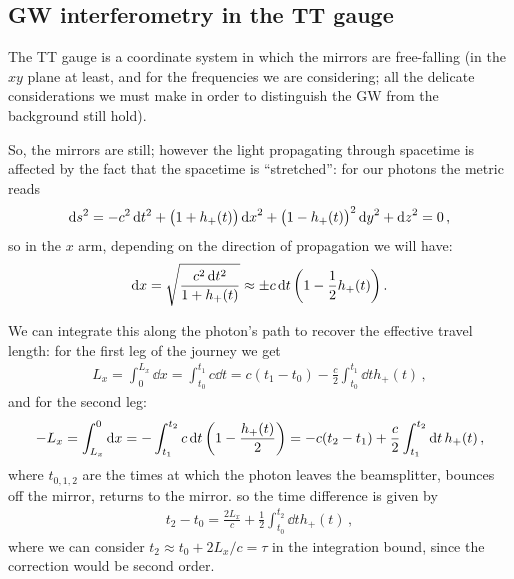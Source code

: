 \documentclass[main.tex]{subfiles}
\begin{document}
\subsection{GW interferometry in the TT gauge}



The TT gauge is a coordinate system in which the mirrors are free-falling (in the \(xy\) plane at least, and for the frequencies we are considering; all the delicate considerations we must make in order to distinguish the GW from the background still hold). 

So, the mirrors are still; however the light propagating through spacetime is affected by the fact that the spacetime is ``stretched'': for our photons the metric reads
%
\begin{align}
\dd{s^2} = - c^2 \dd{t^2} + \qty(1 + h_{+} (t)) \dd{x}^2 + \qty(1 - h_{+}(t))^2 \dd{y}^2 + \dd{z}^2 = 0
\,,
\end{align}
%
so in the \(x\) arm, depending on the direction of propagation we will have: 
%
\begin{align}
\dd{x} = \sqrt{ \frac{c^2 \dd{t^2}}{1 + h_{+}(t)}}
\approx \pm c \dd{t} \qty(1 - \frac{1}{2} h_{+}(t))
\,.
\end{align}

We can integrate this along the photon's path to recover the effective travel length: for the first leg of the journey we get
%
\begin{align}
L_{x} = \int_{0}^{L_x} \dd{x} = \int_{t_0 }^{t_1 } c \dd{t} = c (t_1 - t_0 ) 
- \frac{c}{2} \int_{t_0 }^{t_1 } \dd{t} h_{+}(t) 
\,,
\end{align}
%
and for the second leg: 
%
\begin{align}
- L_x = \int_{L_x}^{0} \dd{x} = - \int_{t_1 }^{t_2 } c \dd{t} \qty(1 - \frac{h_{+}(t)}{2}) = - c (t_2 - t_1 ) + \frac{c}{2} \int_{t_1 }^{t_2 } \dd{t} h_{+}(t) 
\,,
\end{align}
%
where \(t_{0, 1, 2}\) are the times at which the photon leaves the beamsplitter, bounces off the mirror, returns to the mirror. 
so the time difference is given by 
%
\begin{align}
t_2 - t_0 = \frac{2L_x}{c} + \frac{1}{2} \int_{t_0 }^{t_2} \dd{t} h_{+}(t) 
\,,
\end{align}
%
where we can consider \(t_2 \approx t_0  + 2 L_x  /c = \tau\) in the integration bound, since the correction would be second order. 
\end{document}
